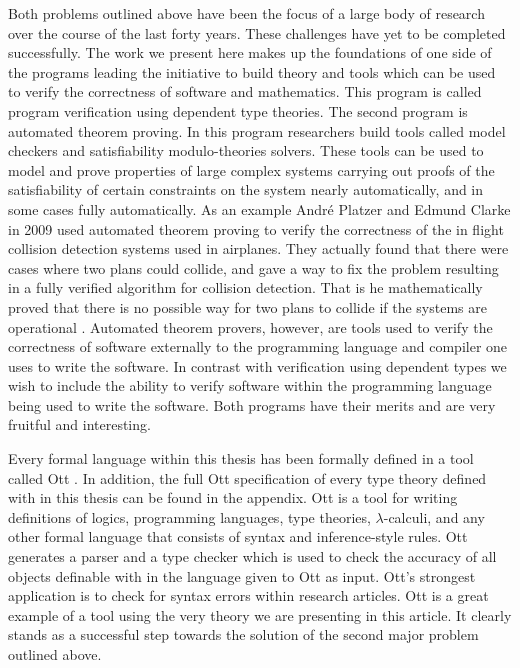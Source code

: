 \documentclass[phd,appendix,dedicationpage,ackpage,epigraphpage]{uithesis}
\begin{document}
Both problems outlined above have been the focus of a large body of
research over the course of the last forty years.  These challenges
have yet to be completed successfully.  The work we present here makes
up the foundations of one side of the programs leading the initiative
to build theory and tools which can be used to verify the correctness
of software and mathematics.  This program is called program
verification using dependent type theories.  The second program is
automated theorem proving.  In this program researchers build tools
called model checkers and satisfiability modulo-theories solvers.
These tools can be used to model and prove properties of large complex
systems carrying out proofs of the satisfiability of certain
constraints on the system nearly automatically, and in some cases
fully automatically.  As an example Andr\'{e} Platzer and Edmund
Clarke in 2009 used automated theorem proving to verify the
correctness of the in flight collision detection systems used in
airplanes.  They actually found that there were cases where two plans
could collide, and gave a way to fix the problem resulting in a fully
verified algorithm for collision detection.  That is he mathematically
proved that there is no possible way for two plans to collide if the
systems are operational \cite{DBLP:conf/fm/PlatzerC09}.  Automated
theorem provers, however, are tools used to verify the correctness of
software externally to the programming language and compiler one uses
to write the software.  In contrast with verification using dependent
types we wish to include the ability to verify software within the
programming language being used to write the software. Both programs
have their merits and are very fruitful and interesting.

Every formal language within this thesis has been formally defined in
a tool called Ott \cite{Sewell:2010}.  In addition, the full Ott
specification of every type theory defined with in this thesis can be
found in the appendix.  Ott is a tool for writing definitions of
logics, programming languages, type theories, $\lambda$-calculi, and
any other formal language that consists of syntax and inference-style
rules.  Ott generates a parser and a type checker which is used to
check the accuracy of all objects definable with in the language given
to Ott as input.  Ott's strongest application is to check for syntax
errors within research articles.  Ott is a great example of a tool
using the very theory we are presenting in this article.  It clearly
stands as a successful step towards the solution of the second major
problem outlined above.
\end{document}
